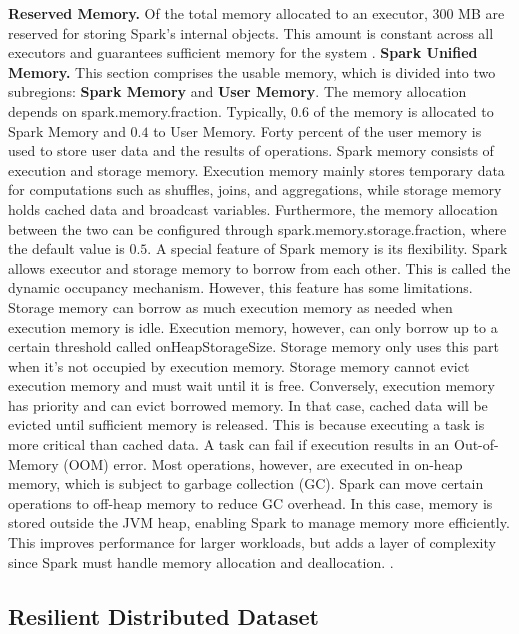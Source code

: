 \textbf{Reserved Memory.} Of the total memory allocated to an executor, 300 MB are reserved for storing Spark's internal objects. This amount is constant across all executors and guarantees sufficient memory for the system \cite{apache_spark_configuration_2025}.
\textbf{Spark Unified Memory.} This section comprises the usable memory, which is divided into two subregions: \textbf{Spark Memory} and \textbf{User Memory}. The memory allocation depends on spark.memory.fraction. Typically, $0.6$ of the memory is allocated to Spark Memory and $0.4$ to User Memory. Forty percent of the user memory is used to store user data and the results of operations. Spark memory consists of execution and storage memory. Execution memory mainly stores temporary data for computations such as shuffles, joins, and aggregations, while storage memory holds cached data and broadcast variables. Furthermore, the memory allocation between the two can be configured through spark.memory.storage.fraction, where the default value is $0.5$. A special feature of Spark memory is its flexibility. Spark allows executor and storage memory to borrow from each other. This is called the dynamic occupancy mechanism. However, this feature has some limitations. Storage memory can borrow as much execution memory as needed when execution memory is idle. Execution memory, however, can only borrow up to a certain threshold called onHeapStorageSize. Storage memory only uses this part when it's not occupied by execution memory. Storage memory cannot evict execution memory and must wait until it is free. Conversely, execution memory has priority and can evict borrowed memory. In that case, cached data will be evicted until sufficient memory is released. This is because executing a task is more critical than cached data. A task can fail if execution results in an Out-of-Memory (OOM) error. Most operations, however, are executed in on-heap memory, which is subject to garbage collection (GC). Spark can move certain operations to off-heap memory to reduce GC overhead. In this case, memory is stored outside the JVM heap, enabling Spark to manage memory more efficiently. This improves performance for larger workloads, but adds a layer of complexity since Spark must handle memory allocation and deallocation. \cite{chambers_spark_2018}\cite{apache_spark_tuning_2025}. 

\subsection{Resilient Distributed Dataset}

